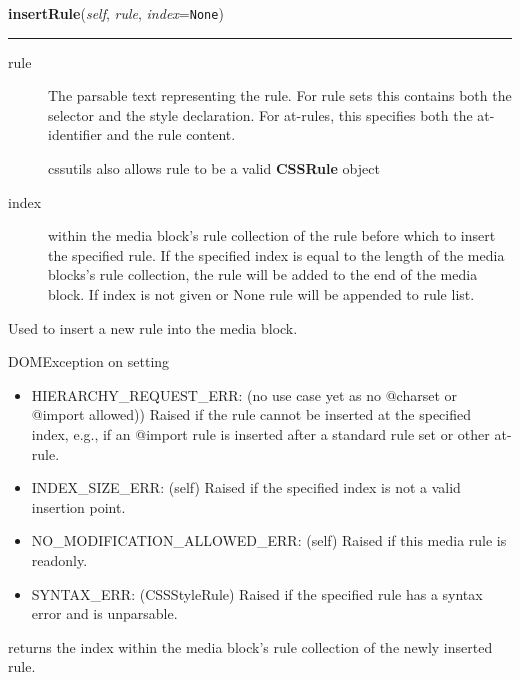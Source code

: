     \label{cssutils:css:cssmediarule:CSSMediaRule:insertRule}

    \vspace{0.5ex}

\hspace{.8\funcindent}\begin{boxedminipage}{\funcwidth}

    \raggedright \textbf{insertRule}(\textit{self}, \textit{rule}, \textit{index}={\tt None})

    \vspace{-1.5ex}

    \rule{\textwidth}{0.5\fboxrule}
\setlength{\parskip}{2ex}
\begin{description}
\item[{rule}] \leavevmode 
The parsable text representing the rule. For rule sets this
contains both the selector and the style declaration. For
at-rules, this specifies both the at-identifier and the rule
content.

cssutils also allows rule to be a valid \textbf{CSSRule} object

\item[{index}] \leavevmode 
within the media block's rule collection of the rule before
which to insert the specified rule. If the specified index is
equal to the length of the media blocks's rule collection, the
rule will be added to the end of the media block.
If index is not given or None rule will be appended to rule
list.

\end{description}

Used to insert a new rule into the media block.

DOMException on setting
\begin{itemize}
\item {} 
HIERARCHY{\_}REQUEST{\_}ERR:
(no use case yet as no @charset or @import allowed))
Raised if the rule cannot be inserted at the specified index,
e.g., if an @import rule is inserted after a standard rule set
or other at-rule.

\item {} 
INDEX{\_}SIZE{\_}ERR: (self)
Raised if the specified index is not a valid insertion point.

\item {} 
NO{\_}MODIFICATION{\_}ALLOWED{\_}ERR: (self)
Raised if this media rule is readonly.

\item {} 
SYNTAX{\_}ERR: (CSSStyleRule)
Raised if the specified rule has a syntax error and is
unparsable.

\end{itemize}

returns the index within the media block's rule collection of the
newly inserted rule.
\setlength{\parskip}{1ex}
    \end{boxedminipage}


